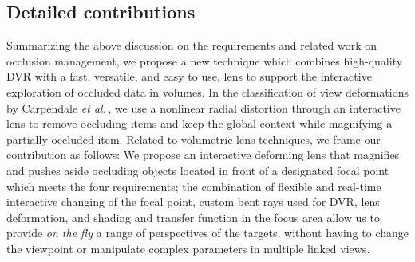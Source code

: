 \vspace{-0.09cm}
\subsection{Detailed contributions}
%
Summarizing the above discussion on the requirements and related work on occlusion management, we propose a new technique which combines high-quality DVR with a fast, versatile, and easy to use, lens to support the interactive exploration of occluded data in volumes. In the classification of view deformations by Carpendale \emph{et al.}\,\cite{595268}, we use a nonlinear radial distortion through an interactive lens to remove occluding items and keep the global context while magnifying a partially occluded item. Related to volumetric lens techniques, we frame our contribution as follows: We propose an interactive deforming lens that magnifies and pushes aside occluding objects located in front of a designated focal point which meets the four requirements; the combination of flexible and real-time interactive changing of the focal point, custom bent rays used for DVR, lens deformation, and shading and transfer function in the focus area allow us to provide \emph{on the fly} a range of perspectives of the targets, without having to change the viewpoint or manipulate complex parameters in multiple linked views.


